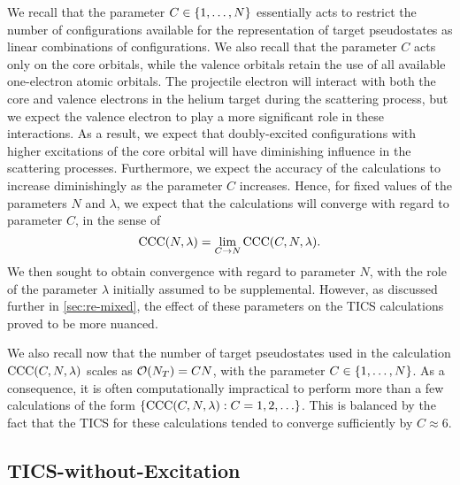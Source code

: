 \documentclass[]{article}
\begin{document}
We recall that the parameter $C \in \lbrace1, \dotsc, N\rbrace$ essentially acts to
restrict the number of configurations available for the representation of target
pseudostates as linear combinations of configurations.
We also recall that the parameter $C$ acts only on the core orbitals, while the
valence orbitals retain the use of all available one-electron atomic orbitals.
The projectile electron will interact with both the core and valence electrons
in the helium target during the scattering process, but we expect the valence
electron to play a more significant role in these interactions.
As a result, we expect that doubly-excited configurations with higher
excitations of the core orbital will have diminishing influence in the
scattering processes.
Furthermore, we expect the accuracy of the calculations to increase
diminishingly as the parameter $C$ increases.
Hence, for fixed values of the parameters $N$ and $\lambda$, we expect that the
calculations will converge with regard to parameter $C$, in the sense of
\begin{equation*}
  \mathrm{CCC}(N, \lambda)
  =
  \lim_{C \to N}
  \mathrm{CCC}(C, N, \lambda)
  .
\end{equation*}
We then sought to obtain convergence with regard to parameter $N$, with the role
of the parameter $\lambda$ initially assumed to be supplemental.
However, as discussed further in \autoref{sec:re-mixed}, the effect of these
parameters on the TICS calculations proved to be more nuanced.


We also recall now that the number of target pseudostates used in the
calculation $\mathrm{CCC}(C, N, \lambda)$ scales as
$\mathcal{O}(N_{T}) = C N$, with the parameter $C \in \lbrace1, \dotsc, N\rbrace$.
As a consequence, it is often computationally impractical to perform more than a
few calculations of the form
$\lrset{\mathrm{CCC}\lr{C, N, \lambda} : C = 1, 2, \dotsc}$.
This is balanced by the fact that the TICS for these calculations tended to
converge sufficiently by $C \approx 6$.

\clearpage

\subsection{TICS-without-Excitation}
\label{sec:re-tics-iw}

\end{document}

